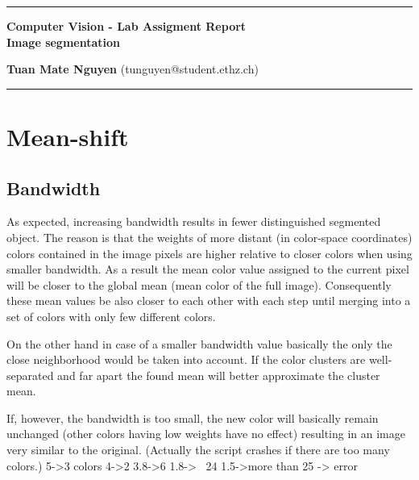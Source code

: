 \documentclass[10pt,a4paper,twoside]{article}
\begin{document}
\begin{center}
\hrule

\vspace{.2cm}
{\bf {\Large Computer Vision - Lab Assigment Report} \\ {\Large Image segmentation}}
\vspace{.1cm}
\end{center}
{\bf Tuan Mate Nguyen}  (tunguyen@student.ethz.ch)
\hrule
\section*{Mean-shift}

\subsection*{Bandwidth}
As expected, increasing bandwidth results in fewer distinguished segmented
object. The reason is that the weights of more distant (in color-space
coordinates) colors contained in the
image pixels are higher relative to closer colors when using smaller bandwidth.
 As a result the mean color value assigned
to the current pixel will be closer to the global mean (mean color of the full image).
Consequently these mean values be also closer to each other with each step until
merging into a set of colors with only few different colors.

On the other hand in case of a smaller bandwidth value basically the only the
close neighborhood would be taken into account. If the color clusters are
well-separated and far apart the found mean will better approximate the cluster
mean.

If, however, the bandwidth is too small, the new color will basically remain
unchanged (other colors having low weights have no effect) resulting in an image
very similar to the original. (Actually the script crashes if there are too many colors.)
5->3 colors
4->2 
3.8->6
1.8-> ~24
1.5->more than 25 -> error
\end{document}
